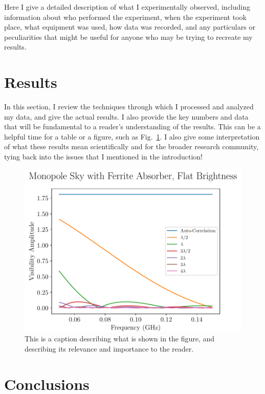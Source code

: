 \documentclass[preprint]{aastex}
\begin{document}
Here I give a detailed description of what I experimentally observed, including 
information about who performed the experiment, when the experiment took place, 
what equipment was used, how data was recorded, and any particulars or 
peculiarities that might be useful for anyone who may be trying to recreate my 
results.

\section{Results}

In this section, I review the techniques through which I processed and analyzed 
my data, and give the actual results. I also provide the key numbers and data 
that will be fundamental to a reader's understanding of the results. This can 
be a helpful time for a table or a figure, such as 
Fig.~\ref{fig:figure-example}.  I also give some interpretation of what these 
results mean scientifically and for the broader research community, tying back 
into the issues that I mentioned in the introduction!

\begin{figure}
    \begin{center}
    \includegraphics[width=\linewidth]{fig_example}
    \end{center}
    \caption{
        This is a caption describing what is shown in the figure, and 
        describing its relevance and importance to the reader.
    }
    \label{fig:figure-example}
\end{figure}

\section{Conclusions}
\end{document}
